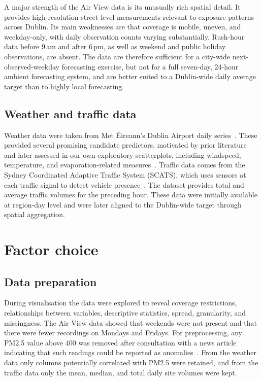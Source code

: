 \documentclass[11pt,a4paper]{article}
\begin{document}
	A major strength of the Air View data is its unusually rich spatial detail. It provides high-resolution street-level measurements relevant to exposure patterns across Dublin. Its main weaknesses are that coverage is mobile, uneven, and weekday-only, with daily observation counts varying substantially. Rush-hour data before 9\,am and after 6\,pm, as well as weekend and public holiday observations, are absent. The data are therefore sufficient for a city-wide next-observed-weekday forecasting exercise, but not for a full seven-day, 24-hour ambient forecasting system, and are better suited to a Dublin-wide daily average target than to highly local forecasting.
	
	
	\subsection*{Weather and traffic data}
	
	Weather data were taken from Met \'Eireann's Dublin Airport daily series~\cite{metdata}. These provided several promising candidate predictors, motivated by prior literature and later assessed in our own exploratory scatterplots, including windspeed, temperature, and evaporation-related measures~\cite{yang2020}. Traffic data comes from the Sydney Coordinated Adaptive Traffic System (SCATS), which uses sensors at each traffic signal to detect vehicle presence~\cite{scatsdata}. The dataset provides total and average traffic volumes for the preceding hour. These data were initially available at region-day level and were later aligned to the Dublin-wide target through spatial aggregation.
	
	\vspace{2cm}
	
	\section{Factor choice}
	
	\subsection*{Data preparation}
	
	During visualisation the data were explored to reveal coverage restrictions, relationships between variables, descriptive statistics, spread, granularity, and missingness. The Air View data showed that weekends were not present and that there were fewer recordings on Mondays and Fridays. For preprocessing, any PM2.5 value above 400 was removed after consultation with a news article indicating that such readings could be reported as anomalies~\cite{breakingnews}. From the weather data only columns potentially correlated with PM2.5 were retained, and from the traffic data only the mean, median, and total daily site volumes were kept.
	
\end{document}

